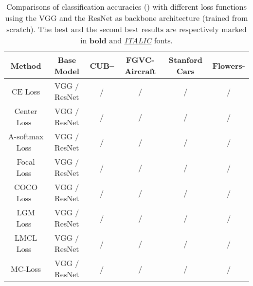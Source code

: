 \documentclass[journal]{IEEEtran}
\begin{document}
\begin{table*}[!t]
  \centering
  \small
\caption{Comparisons of classification accuracies () with different loss functions using the VGG and the ResNet as backbone architecture (trained from scratch). The best and the second best results are respectively marked in \textbf{bold} and \underline{\emph{ITALIC}} fonts.}
    \begin{tabular}{|c|c|c|c|c|c|}
    \hline
    Method                                   & Base Model                                 & CUB--                        & FGVC-Aircraft                                                & Stanford Cars                             & Flowers- \\
    \hline
    \hline
    CE Loss                                  & VGG / ResNet                       &  /                        &  /                                             &  /                          &  /   \\
    Center Loss~\cite{wen2016discriminative} & VGG / ResNet                       &  /   &  /   &  /     &  /   \\
    A-softmax Loss~\cite{liu2017sphereface}  & VGG / ResNet                       &  /   &  /                                             &  /     &  /  \\
    Focal Loss~\cite{lin2017focal}           & VGG / ResNet                       &  /                        &  /                                             &  /                          &  /   \\
    COCO Loss~\cite{liu2017rethinking}       & VGG / ResNet                       &  /                        &  /                                             &  /                          &  /  \\
    LGM Loss~\cite{wan2018rethinking}        & VGG / ResNet                       &  /                        &  /                                             &  /                          &  /   \\
    LMCL Loss~\cite{wang2018cosface}              & VGG / ResNet                       &  /                        &  /                                             &  /                          &  /  \\
    \hline
    \hline
    MC-Loss                                  & VGG / ResNet                       &  /      &  /                             &   /      &  /  \\
    \hline
    
    \end{tabular}\label{tab:table_loss_function}\end{table*}
\end{document}

